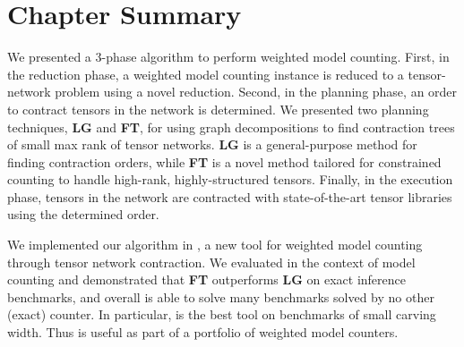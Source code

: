 \section{Chapter Summary} \label{sec:tensors:conclusion}
We presented a 3-phase algorithm to perform weighted model counting. First, in the reduction phase, a weighted model counting instance is reduced to a tensor-network problem using a novel reduction. Second, in the planning phase, an order to contract tensors in the network is determined. We presented two planning techniques, \textbf{LG} and \textbf{FT}, for using graph decompositions to find contraction trees of small max rank of tensor networks. \textbf{LG} is a general-purpose method for finding contraction orders, while \textbf{FT} is a novel method tailored for constrained counting to handle high-rank, highly-structured tensors. Finally, in the execution phase, tensors in the network are contracted with state-of-the-art tensor libraries using the determined order.


We implemented our algorithm in , a new tool for weighted model counting through tensor network contraction.
We evaluated  in the context of model counting and demonstrated that \textbf{FT} outperforms \textbf{LG} on exact inference benchmarks, and overall  is able to solve many benchmarks solved by no other (exact) counter.
In particular,  is the best tool on benchmarks of small carving width.
Thus  is useful as part of a portfolio of weighted model counters.





